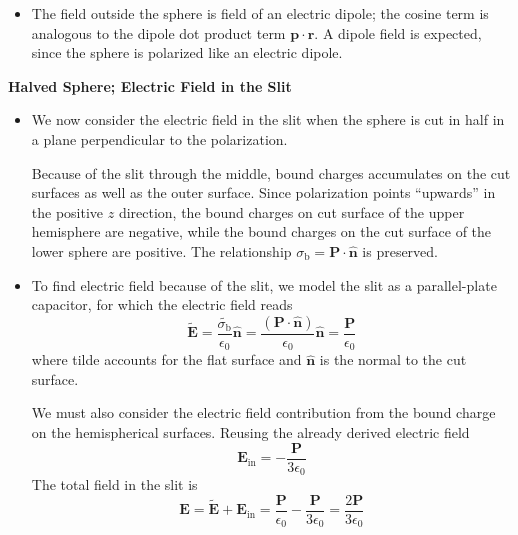 \documentclass[11pt, a4paper]{article}
\renewcommand{\vec}[1]{\bm{#1}} %
\newcommand{\uvec}[1]{\hat{\vec{#1}}} %
\renewcommand{\t}[1]{\tilde{#1}} %
\renewcommand{\r}{\vec{r}}
\newcommand{\E}{\vec{E}}  %
\newcommand{\ee}{\epsilon_{0}}  %
\newcommand{\pe}{\vec{p}}  %
\renewcommand{\P}{\vec{P}}  %
\begin{document}
\begin{itemize}
	\item The field outside the sphere is field of an electric dipole; the cosine term is analogous to the dipole dot product term $ \pe \cdot \r $. A dipole field is expected, since the sphere is polarized like an electric dipole. 
	
\end{itemize}

\textbf{Halved Sphere; Electric Field in the Slit}
\begin{itemize}
	\item We now consider the electric field in the slit when the sphere is cut in half in a plane perpendicular to the polarization. 
	
	Because of the slit through the middle, bound charges accumulates on the cut surfaces as well as the outer surface. Since polarization points ``upwards'' in the positive $ z $ direction, the bound charges on cut surface of the upper hemisphere are negative, while the bound charges on the cut surface of the lower sphere are positive. The relationship $ \sigma_{\text{b}} = \P \cdot \uvec{n} $ is preserved. 
	
	\item To find electric field because of the slit, we model the slit as a parallel-plate capacitor, for which the electric field reads
	\begin{equation*}
		\t{\E} = \frac{\t{\sigma_{\text{b}}}}{\ee}\uvec{n} = \frac{(\P \cdot \uvec{n})}{\ee} \uvec{n} = \frac{\P}{\ee}
	\end{equation*}
	where tilde accounts for the flat surface and $ \uvec{n} $ is the normal to the cut surface.
	
	We must also consider the electric field contribution from the bound charge on the hemispherical surfaces. Reusing the already derived electric field
	\begin{equation*}
		\E_{\text{in}} = - \frac{\P}{3\ee}
	\end{equation*}
	The total field in the slit is
	\begin{equation*}
		\E = \t{\E} + \E_{\text{in}} = \frac{\P}{\ee} - \frac{\P}{3\ee} = \frac{2\P}{3\ee}
	\end{equation*}
\end{itemize}
\end{document}
